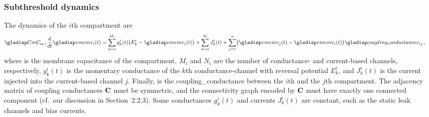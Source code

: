 \subsubsection{Subthreshold dynamics}
The dynamics of the $i$th compartment are
\begin{align}
	\Cmi \frac{d}{dt} \vMemi(t) &=
		\sum_{k=1}^{M_i} g_k^i(t) \bigl( E_k^i - \vMemi(t) \bigr) +
		\sum_{k=1}^{N_i} J_k^i(t) +
		\sum_{j=1}^{n} \bigl(\vMemj(t) - \vMemi(t)\bigr) \cij \,,
\label{eqn:nlif_single_compartment}
\end{align}
where \Cmi is the membrane capacitance of the compartment, $M_i$ and $N_i$ are the number of conductance- and current-based channels, respectively, $g_{k}^i(t)$ is the momentary conductance of the $k$th conductance-channel with reversal potential $E_{k}^i$, and $J_{k}^i(t)$ is the current injected into the current-based channel $j$.
Finally, \cij is the \gls{coupling_conductance} between the $i$th and the $j$th compartment.
The adjacency matrix of coupling conductances $\mathbf{C}$ must be symmetric, and the connectivity graph encoded by $\mathbf{C}$ must have exactly one connected component (cf.~our discussion in Section~2.2.3).
Some conductances $g_{k}^i(t)$ and currents $J_{k}^i(t)$ are constant, such as the static leak channels and bias currents.

